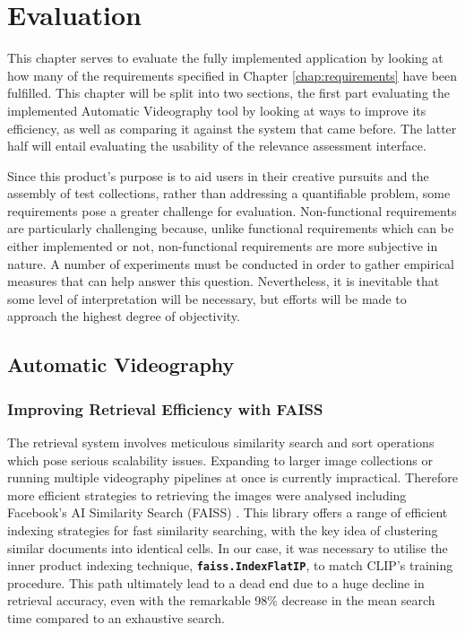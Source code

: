 \documentclass{l4proj}
\begin{document}




\chapter{Evaluation} 
This chapter serves to evaluate the fully implemented application by looking at how many of the requirements specified in Chapter \ref{chap:requirements} have been fulfilled. This chapter will be split into two sections, the first part evaluating the implemented Automatic Videography tool by looking at ways to improve its efficiency, as well as comparing it against the system that came before. The latter half will entail evaluating the usability of the relevance assessment interface.

Since this product's purpose is to aid users in their creative pursuits and the assembly of test collections, rather than addressing a quantifiable problem, some requirements pose a greater challenge for evaluation. Non-functional requirements are particularly challenging because, unlike functional requirements which can be either implemented or not, non-functional requirements are more subjective in nature. A number of experiments must be conducted in order to gather empirical measures that can help answer this question. Nevertheless, it is inevitable that some level of interpretation will be necessary, but efforts will be made to approach the highest degree of objectivity.

\section{Automatic Videography}
\subsection{Improving Retrieval Efficiency with FAISS}
The retrieval system involves meticulous similarity search and sort operations which pose serious scalability issues. Expanding to larger image collections or running multiple videography pipelines at once is currently impractical. Therefore more efficient strategies to retrieving the images were analysed including Facebook's AI Similarity Search (FAISS) \citep{johnson2019faiss}. This library offers a range of efficient indexing strategies for fast similarity searching, with the key idea of clustering similar documents into identical cells. In our case, it was necessary to utilise the inner product indexing technique, \textbf{\lstinline|faiss.IndexFlatIP|}, to match CLIP's training procedure. This path ultimately lead to a dead end due to a huge decline in retrieval accuracy, even with the remarkable 98\% decrease in the mean search time compared to an exhaustive search. 
\end{document}
